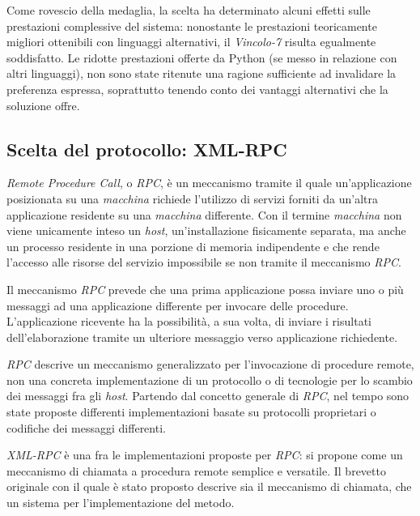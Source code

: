 Come rovescio della medaglia, la scelta ha determinato alcuni effetti sulle prestazioni complessive del sistema: nonostante le prestazioni teoricamente migliori ottenibili con linguaggi alternativi, il \emph{Vincolo-7} risulta egualmente soddisfatto. Le ridotte prestazioni offerte da Python (se messo in relazione con altri linguaggi), non sono state ritenute una ragione sufficiente ad invalidare la preferenza espressa, soprattutto tenendo conto dei vantaggi alternativi che la soluzione offre.

\subsection{Scelta del protocollo: XML-RPC}

\emph{Remote Procedure Call}, o \emph{RPC}, è un meccanismo tramite il quale un'applicazione posizionata su una \emph{macchina} richiede l'utilizzo di servizi forniti da un'altra applicazione residente su una \emph{macchina} differente. Con il termine \emph{macchina} non viene unicamente inteso un \emph{host}, un'installazione fisicamente separata, ma anche un processo residente in una porzione di memoria indipendente e che rende l'accesso alle risorse del servizio impossibile se non tramite il meccanismo \emph{RPC}. 

Il meccanismo \emph{RPC} prevede che una prima applicazione possa inviare uno o più messaggi ad una applicazione differente per invocare delle procedure. L'applicazione ricevente ha la possibilità,  a sua volta, di inviare i risultati dell'elaborazione tramite un ulteriore messaggio verso applicazione richiedente.~\cite{MERRICK:2006:misc}

\emph{RPC} descrive un meccanismo generalizzato per l'invocazione di procedure remote, non una concreta implementazione di un protocollo o di tecnologie per lo scambio dei messaggi fra gli \emph{host}. Partendo dal concetto generale di \emph{RPC}, nel tempo sono state proposte differenti implementazioni basate su protocolli proprietari o codifiche dei messaggi differenti.~\cite{JAIRATH:2004:misc}~\cite{dcerpc}

\emph{XML-RPC} è una fra le implementazioni proposte per \emph{RPC}: si propone come un meccanismo di chiamata a procedura remote semplice e versatile. Il brevetto originale con il quale è stato proposto descrive sia il meccanismo di chiamata, che un sistema per l'implementazione del metodo.~\cite{MERRICK:2006:misc}

